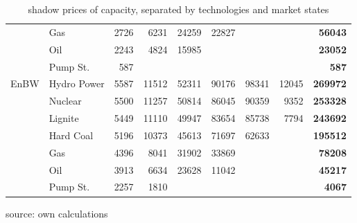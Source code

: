\begin{table}
\begin{tabular}{llrrrrrrr}
           &        Gas &       2726 &       6231 &      24259 &      22827 &            &            & {\bf 56043} \\

           &        Oil &       2243 &       4824 &      15985 &            &            &            & {\bf 23052} \\

           &   Pump St. &        587 &            &            &            &            &            &  {\bf 587} \\
\hline
      EnBW & Hydro Power &       5587 &      11512 &      52311 &      90176 &      98341 &      12045 & {\bf 269972} \\

           &    Nuclear &       5500 &      11257 &      50814 &      86045 &      90359 &       9352 & {\bf 253328} \\

           &    Lignite &       5449 &      11110 &      49947 &      83654 &      85738 &       7794 & {\bf 243692} \\

           &  Hard Coal &       5196 &      10373 &      45613 &      71697 &      62633 &            & {\bf 195512} \\

           &        Gas &       4396 &       8041 &      31902 &      33869 &            &            & {\bf 78208} \\

           &        Oil &       3913 &       6634 &      23628 &      11042 &            &            & {\bf 45217} \\

           &   Pump St. &       2257 &       1810 &            &            &            &            & {\bf 4067} \\
\hline
\hline
\end{tabular}  
 

\label{tab:statlambda}
\caption{shadow prices of capacity, separated by technologies and market states}
\begin{center}
source: own calculations
\end{center}
\end{table}